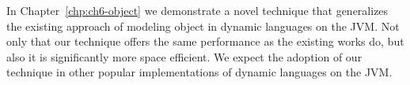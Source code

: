 In Chapter~\ref{chp:ch6-object} we demonstrate a novel technique that generalizes the existing approach of modeling object in dynamic languages on the JVM.
Not only that our technique offers the same performance as the existing works do, but also it is significantly more space efficient.
We expect the adoption of our technique in other popular implementations of dynamic languages on the JVM.
